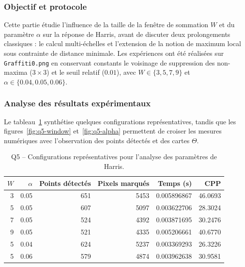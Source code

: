 \documentclass[11pt,a4paper]{article}
\begin{document}
\subsubsection{Objectif et protocole}
Cette partie étudie l'influence de la taille de la fenêtre de sommation \(W\) et du paramètre \(\alpha\) sur la réponse de Harris, avant de discuter deux prolongements classiques : le calcul multi-échelles et l'extension de la notion de maximum local sous contrainte de distance minimale. Les expériences ont été réalisées sur \texttt{Graffiti0.png} en conservant constants le voisinage de suppression des non-maxima (\(3 \times 3\)) et le seuil relatif (\(0.01\)), avec \(W \in \{3,5,7,9\}\) et \(\alpha \in \{0.04,0.05,0.06\}\).

\subsubsection{Analyse des résultats expérimentaux}
Le tableau~\ref{tab:q5-metrics} synthétise quelques configurations représentatives, tandis que les figures~\ref{fig:q5-window} et~\ref{fig:q5-alpha} permettent de croiser les mesures numériques avec l'observation des points détectés et des cartes \(\Theta\).

\begin{table}[H]
  \centering
  \caption{Q5 -- Configurations représentatives pour l'analyse des paramètres de Harris.}
  \label{tab:q5-metrics}
  \footnotesize
  \begin{tabular}{@{}rrrrrr@{}}
    \toprule
    \(W\) & \(\alpha\) & Points détectés & Pixels marqués & Temps (s) & CPP \\
    \midrule
    3 & 0.05 & 651 & 5453 & 0.005896867 & 46.0693 \\
    5 & 0.05 & 607 & 5097 & 0.003622706 & 28.3024 \\
    7 & 0.05 & 524 & 4392 & 0.003871695 & 30.2476 \\
    9 & 0.05 & 521 & 4335 & 0.005206661 & 40.6770 \\
    5 & 0.04 & 624 & 5237 & 0.003369293 & 26.3226 \\
    5 & 0.06 & 579 & 4874 & 0.003962638 & 30.9581 \\
    \bottomrule
  \end{tabular}
\end{table}
\end{document}
